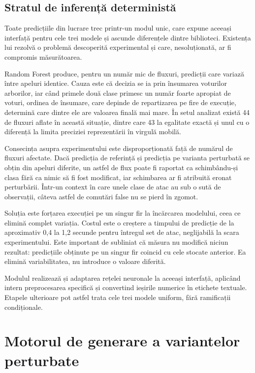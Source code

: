 \subsection{Stratul de inferență deterministă}\label{subsec:inferenta}

Toate predicțiile din lucrare trec printr-un modul unic, care expune aceeași interfață pentru cele trei modele și ascunde diferențele dintre biblioteci. Existența lui rezolvă o problemă descoperită experimental și care, nesoluționată, ar fi compromis măsurătoarea.

Random Forest produce, pentru un număr mic de fluxuri, predicții care variază între apeluri identice. Cauza este că decizia se ia prin însumarea voturilor arborilor, iar când primele două clase primesc un număr foarte apropiat de voturi, ordinea de însumare, care depinde de repartizarea pe fire de execuție, determină care dintre ele are valoarea finală mai mare. În setul analizat există 44 de fluxuri aflate în această situație, dintre care 43 la egalitate exactă și unul cu o diferență la limita preciziei reprezentării în virgulă mobilă.

Consecința asupra experimentului este disproporționată față de numărul de fluxuri afectate. Dacă predicția de referință și predicția pe varianta perturbată se obțin din apeluri diferite, un astfel de flux poate fi raportat ca schimbându-și clasa fără ca nimic să fi fost modificat, iar schimbarea ar fi atribuită eronat perturbării. Într-un context în care unele clase de atac au sub o sută de observații, câteva astfel de comutări false nu se pierd în zgomot.

Soluția este forțarea execuției pe un singur fir la încărcarea modelului, ceea ce elimină complet variația. Costul este o creștere a timpului de predicție de la aproximativ 0{,}4 la 1{,}2 secunde pentru întregul set de atac, neglijabilă la scara experimentului. Este important de subliniat că măsura nu modifică niciun rezultat: predicțiile obținute pe un singur fir coincid cu cele stocate anterior. Ea elimină variabilitatea, nu introduce o valoare diferită.

Modulul realizează și adaptarea rețelei neuronale la aceeași interfață, aplicând intern preprocesarea specifică și convertind ieșirile numerice în etichete textuale. Etapele ulterioare pot astfel trata cele trei modele uniform, fără ramificații condiționale.

\section{Motorul de generare a variantelor perturbate}\label{sec:motor}

